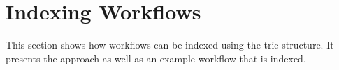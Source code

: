 \section{Indexing Workflows}
\label{sec:indexation}
This section shows how workflows can be indexed using the trie structure. It presents the approach as well as an example workflow that is indexed.